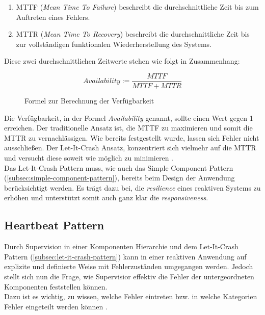 \begin{enumerate}
\item MTTF (\textit{Mean Time To Failure}) beschreibt die durchschnittliche Zeit bis zum Auftreten eines Fehlers.
\item MTTR (\textit{Mean Time To Recovery}) beschreibt die durchschnittliche Zeit bis zur vollständigen funktionalen Wiederherstellung des Systems.
\end{enumerate}

Diese zwei durchschnittlichen Zeitwerte stehen wie folgt in Zusammenhang:

\begin{figure}[H]
\[Availability := \frac{MTTF}{MTTF + MTTR}\]
\caption{Formel zur Berechnung der Verfügbarkeit}
\end{figure}

Die Verfügbarkeit, in der Formel \textit{Availability} genannt, sollte einen Wert gegen 1 erreichen. Der traditionelle Ansatz ist, die MTTF zu maximieren und somit die MTTR zu vernachlässigen. Wie bereits festgestellt wurde, lassen sich Fehler nicht ausschließen. Der Let-It-Crash Ansatz, konzentriert sich vielmehr auf die MTTR und versucht diese soweit wie möglich zu minimieren \cite[S.~198]{kuhn_reactive_2015} \cite{friedrichsen_unkaputtbar_2014}.\\

Das Let-It-Crash Pattern muss, wie auch das Simple Component Pattern (\ref{subsec:simple-component-pattern}), bereits beim Design der Anwendung berücksichtigt werden. Es trägt dazu bei, die \textit{resilience} eines reaktiven Systems zu erhöhen und unterstützt somit auch ganz klar die \textit{responsiveness}.

\pagebreak

\subsection{Heartbeat Pattern}\label{subsec:heartbeat-pattern}
Durch Supervision in einer Komponenten Hierarchie und dem Let-It-Crash Pattern (\ref{subsec:let-it-crash-pattern}) kann in einer reaktiven Anwendung auf explizite und definierte Weise mit Fehlerzuständen umgegangen werden. Jedoch stellt sich nun die Frage, wie Supervisior effektiv die Fehler der untergeordneten Komponenten feststellen können.\\
Dazu ist es wichtig, zu wissen, welche Fehler eintreten bzw. in welche Kategorien Fehler eingeteilt werden können \cite{friedrichsen_unkaputtbar_2014}.

